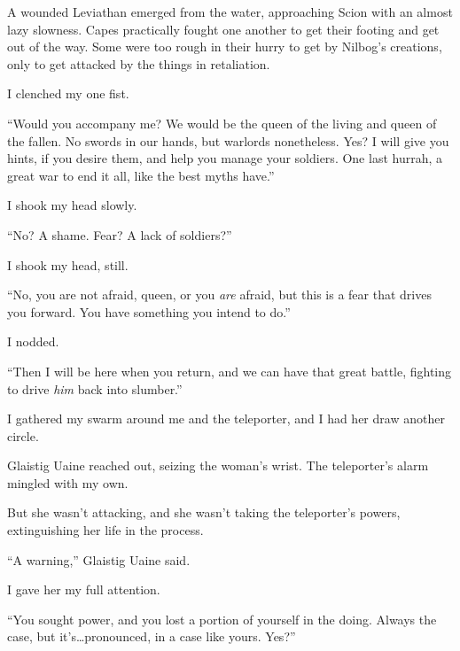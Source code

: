 A wounded Leviathan emerged from the water, approaching Scion with an almost lazy slowness.  Capes practically fought one another to get their footing and get out of the way.  Some were too rough in their hurry to get by Nilbog's creations, only to get attacked by the things in retaliation.



I clenched my one fist.



``Would you accompany me?  We would be the queen of the living and queen of the fallen.  No swords in our hands, but warlords nonetheless.  Yes?  I will give you hints, if you desire them, and help you manage your soldiers.  One last hurrah, a great war to end it all, like the best myths have.''



I shook my head slowly.



``No?  A shame.  Fear?  A lack of soldiers?''



I shook my head, still.



``No, you are not afraid, queen, or you \emph{are} afraid, but this is a fear that drives you forward.  You have something you intend to do.''



I nodded.



``Then I will be here when you return, and we can have that great battle, fighting to drive \emph{him} back into slumber.''



I gathered my swarm around me and the teleporter, and I had her draw another circle.



Glaistig Uaine reached out, seizing the woman's wrist.  The teleporter's alarm mingled with my own.



But she wasn't attacking, and she wasn't taking the teleporter's powers, extinguishing her life in the process.



``A warning,'' Glaistig Uaine said.



I gave her my full attention.



``You sought power, and you lost a portion of yourself in the doing.  Always the case, but it's\ldots pronounced, in a case like yours.  Yes?''



